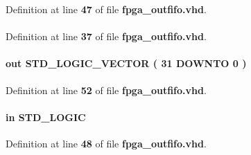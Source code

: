 Definition at line {\bf 47} of file {\bf fpga\+\_\+outfifo.\+vhd}.

\paragraph[{ieee}]{\hspace{0.3cm}{\ttfamily [Library]}}\label{classfpga__outfifo_a0a6af6eef40212dbaf130d57ce711256}


Definition at line {\bf 37} of file {\bf fpga\+\_\+outfifo.\+vhd}.

\paragraph[{q}]{ {\bfseries \textcolor{keywordflow}{out}\textcolor{vhdlchar}{ }} {\bfseries \textcolor{comment}{S\+T\+D\+\_\+\+L\+O\+G\+I\+C\+\_\+\+V\+E\+C\+T\+OR}\textcolor{vhdlchar}{ }\textcolor{vhdlchar}{(}\textcolor{vhdlchar}{ }\textcolor{vhdlchar}{ } \textcolor{vhdldigit}{31} \textcolor{vhdlchar}{ }\textcolor{keywordflow}{D\+O\+W\+N\+TO}\textcolor{vhdlchar}{ }\textcolor{vhdlchar}{ } \textcolor{vhdldigit}{0} \textcolor{vhdlchar}{ }\textcolor{vhdlchar}{)}\textcolor{vhdlchar}{ }} \hspace{0.3cm}{\ttfamily [Port]}}\label{classfpga__outfifo_aea5fb4b3a050af0b1556be3e3b21cef9}


Definition at line {\bf 52} of file {\bf fpga\+\_\+outfifo.\+vhd}.

\paragraph[{rdclk}]{ {\bfseries \textcolor{keywordflow}{in}\textcolor{vhdlchar}{ }} {\bfseries \textcolor{comment}{S\+T\+D\+\_\+\+L\+O\+G\+IC}\textcolor{vhdlchar}{ }} \hspace{0.3cm}{\ttfamily [Port]}}\label{classfpga__outfifo_a463d5fc49d1826e964692ab15a4459e5}


Definition at line {\bf 48} of file {\bf fpga\+\_\+outfifo.\+vhd}.


